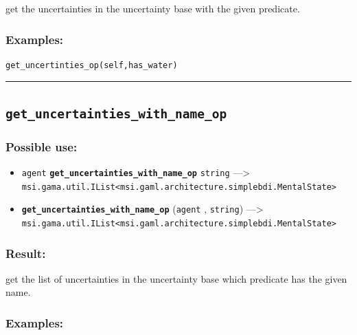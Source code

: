 \documentclass[]{book}
\providecommand{\tightlist}{%
  \setlength{\itemsep}{0pt}\setlength{\parskip}{0pt}}
\theoremstyle{definition}
\theoremstyle{definition}
\theoremstyle{definition}
\theoremstyle{remark}
\begin{document}
get the uncertainties in the uncertainty base with the given predicate.

\subsubsection{Examples:}\label{examples-177}

\begin{verbatim}
get_uncertinties_op(self,has_water) 
\end{verbatim}

\begin{center}\rule{0.5\linewidth}{\linethickness}\end{center}

\subsection{\texorpdfstring{\texttt{get\_uncertainties\_with\_name\_op}}{get\_uncertainties\_with\_name\_op}}\label{get_uncertainties_with_name_op}

\subsubsection{Possible use:}\label{possible-use-233}

\begin{itemize}
\tightlist
\item
  \texttt{agent} \textbf{\texttt{get\_uncertainties\_with\_name\_op}}
  \texttt{string} ---\textgreater{}
  \texttt{msi.gama.util.IList\textless{}msi.gaml.architecture.simplebdi.MentalState\textgreater{}}
\item
  \textbf{\texttt{get\_uncertainties\_with\_name\_op}} (\texttt{agent} ,
  \texttt{string}) ---\textgreater{}
  \texttt{msi.gama.util.IList\textless{}msi.gaml.architecture.simplebdi.MentalState\textgreater{}}
\end{itemize}

\subsubsection{Result:}\label{result-225}

get the list of uncertainties in the uncertainty base which predicate
has the given name.

\subsubsection{Examples:}\label{examples-178}
\end{document}
